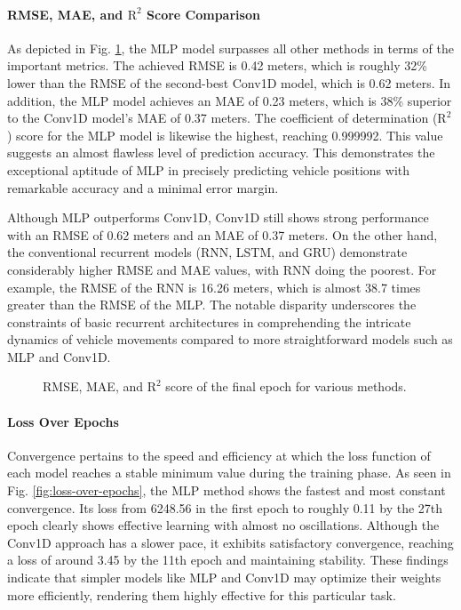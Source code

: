\documentclass[conference]{IEEEtran}
\begin{document}
{\paragraph{RMSE, MAE, and $\text{R}^2$ Score Comparison}
As depicted in Fig. \ref{fig:rmse-mae-r2-methods}, the MLP model surpasses all other methods in terms of the important metrics. The achieved RMSE is 0.42 meters, which is roughly 32\% lower than the RMSE of the second-best Conv1D model, which is 0.62 meters. In addition, the MLP model achieves an MAE of 0.23 meters, which is 38\% superior to the Conv1D model's MAE of 0.37 meters. The coefficient of determination ($\text{R}^2$) score for the MLP model is likewise the highest, reaching 0.999992. This value suggests an almost flawless level of prediction accuracy. This demonstrates the exceptional aptitude of MLP in precisely predicting vehicle positions with remarkable accuracy and a minimal error margin.

Although MLP outperforms Conv1D, Conv1D still shows strong performance with an RMSE of 0.62 meters and an MAE of 0.37 meters. On the other hand, the conventional recurrent models (RNN, LSTM, and GRU) demonstrate considerably higher RMSE and MAE values, with RNN doing the poorest. For example, the RMSE of the RNN is 16.26 meters, which is almost 38.7 times greater than the RMSE of the MLP. The notable disparity underscores the constraints of basic recurrent architectures in comprehending the intricate dynamics of vehicle movements compared to more straightforward models such as MLP and Conv1D.

\begin{figure}
    \centering
    
    \caption{RMSE, MAE, and $\text{R}^2$ score of the final epoch for various methods.}
    \label{fig:rmse-mae-r2-methods}
    \vspace{-4mm}
\end{figure}

\paragraph{Loss Over Epochs}
Convergence pertains to the speed and efficiency at which the loss function of each model reaches a stable minimum value during the training phase. As seen in Fig. \ref{fig:loss-over-epochs}, the MLP method shows the fastest and most constant convergence. Its loss from 6248.56 in the first epoch to roughly 0.11 by the 27th epoch clearly shows effective learning with almost no oscillations. Although the Conv1D approach has a slower pace, it exhibits satisfactory convergence, reaching a loss of around 3.45 by the 11th epoch and maintaining stability. These findings indicate that simpler models like MLP and Conv1D may optimize their weights more efficiently, rendering them highly effective for this particular task.

}
\end{document}
